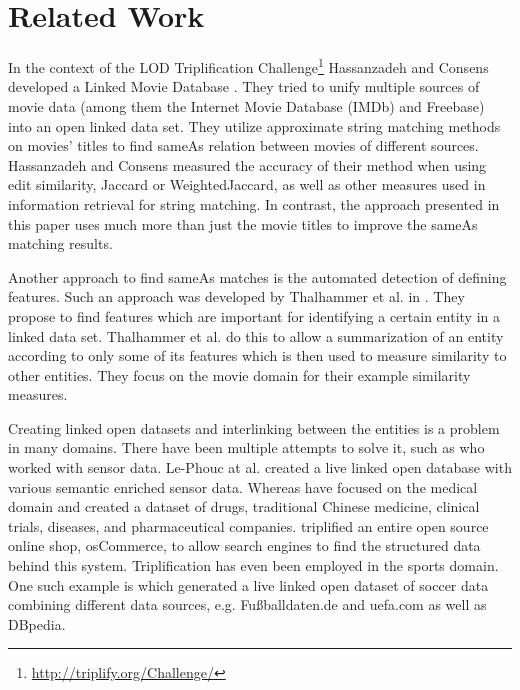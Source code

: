 \section{Related Work}
\label{sec_related_work}


In the context of the LOD Triplification Challenge\footnote{\url{http://triplify.org/Challenge/}} Hassanzadeh and Consens developed a Linked Movie Database \cite{LMDB}.
They tried to unify multiple sources of movie data (among them the Internet Movie Database (IMDb) and Freebase) into an open linked data set.
They utilize approximate string matching methods on movies' titles to find sameAs relation between movies of different sources.
Hassanzadeh and Consens measured the accuracy of their method when using edit similarity, Jaccard or WeightedJaccard, as well as other measures used in information retrieval for string matching.
In contrast, the approach presented in this paper uses much more than just the movie titles to improve the sameAs matching results.

Another approach to find sameAs matches is the automated detection of defining features.
Such an approach was developed by Thalhammer et al. in \cite{MovieSummarization}.
They propose to find features which are important for identifying a certain entity in a linked data set.
Thalhammer et al. do this to allow a summarization of an entity according to only some of its features which is then used to measure similarity to other entities.
They focus on the movie domain for their example similarity measures.

Creating linked open datasets and interlinking between the entities is a problem in many domains.
There have been multiple attempts to solve it, such as \cite{SensorData} who worked with sensor data.
Le-Phouc at al. created a live linked open database with various semantic enriched sensor data.
Whereas \cite{openDrugData} have focused on the medical domain and created a dataset of drugs, traditional Chinese medicine, clinical trials, diseases, and pharmaceutical companies.
\cite{osCommerce} triplified an entire open source online shop, osCommerce, to allow search engines to find the structured data behind this system.
Triplification has even been employed in the sports domain.
One such example is \cite{smm} which generated a live linked open dataset of soccer data combining different data sources, e.g. Fußballdaten.de and uefa.com as well as DBpedia.


